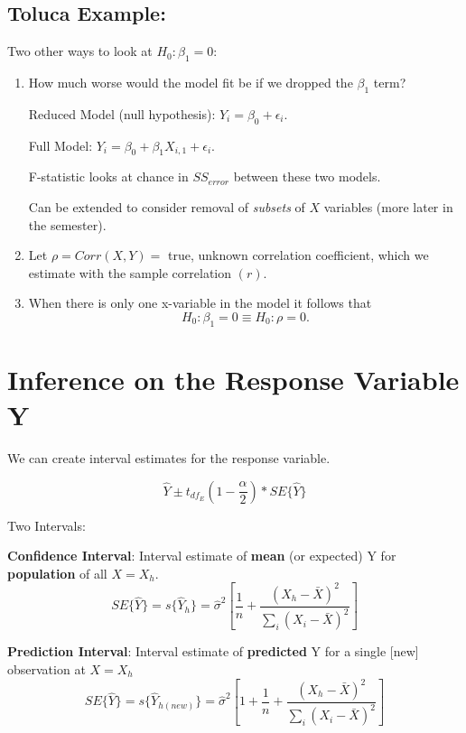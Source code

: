 \documentclass[12pt]{notes}
\begin{document}
\subsection*{Toluca Example:}

\begin{minipage}[l][2cm][c]{\textwidth}

\end{minipage}

Two other ways to look at $H_0: \beta_1 = 0:$

\begin{enumerate}
\item How much worse would the model fit be if we dropped the $\beta_1$ term?

Reduced Model (null hypothesis): $Y_i = \beta_0 + \epsilon_i$. 

Full Model: $Y_i = \beta_0 + \beta_1X_{i,1} + \epsilon_i$.

\nspace
F-statistic looks at chance in $SS_{error}$ between these two models. 

\nspace
Can be extended to consider removal of \textit{subsets} of $X$ variables (more later in the semester).  

\item Let $\rho = Corr(X,Y) = $ true, unknown correlation coefficient, which we estimate with the sample correlation $(r)$. 

\bi
\item When there is only one x-variable in the model it follows that 
\[H_0: \beta_1 = 0 \equiv H_0: \rho = 0.\]
\ei
\end{enumerate}

\section*{Inference on the Response Variable Y}
We can create interval estimates for the response variable. 

\[
\hat{Y} \pm t_{df_E}(1-\frac{\alpha}{2})*SE\{\hat{Y}\}
\]

Two Intervals:
\bi
\item \textbf{Confidence Interval}: Interval estimate of \textbf{mean} (or expected) Y for \textbf{population} of all $X = X_h.$
\[SE\{\hat{Y}\} = s\{\hat{Y}_h\} = \hat{\sigma}^2\left[\frac{1}{n} + \frac{(X_h - \bar{X})^2}{\sum_i (X_i - \bar{X})^2}\right]\]
\item \textbf{Prediction Interval}: Interval estimate of \textbf{predicted} Y for a single [new] observation at $X = X_h$
\[SE\{\hat{Y}\} = s\{\hat{Y}_{h (new)}\} = \hat{\sigma}^2\left[1 + \frac{1}{n} + \frac{(X_h - \bar{X})^2}{\sum_i (X_i - \bar{X})^2}\right]\]
\ei
\end{document}
